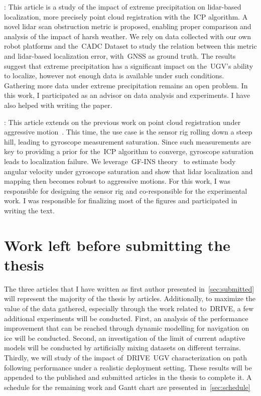 \documentclass[12pt,letterpaper,oneside]{article}
\begin{document}
\textbf{}:
This article is a study of the impact of extreme precipitation on lidar-based localization, more precisely point cloud registration with the~\ac{ICP} algorithm.
A novel lidar scan obstruction metric is proposed, enabling proper comparison and analysis of the impact of harsh weather.
We rely on data collected with our own robot platforms and the~\ac{CADC} Dataset to study the relation between this metric and lidar-based localization error, with~\ac{GNSS} as ground truth.
The results suggest that extreme precipitation has a significant impact on the~\ac{UGV}'s ability to localize, however not enough data is available under such conditions.
Gathering more data under extreme precipitation remains an open problem.
In this work, I participated as an advisor on data analysis and experiments.
I have also helped with writing the paper.

\textbf{}:
This article extends on the previous work on point cloud registration under aggressive motion~\citep{Deschenes2021}.
This time, the use case is the sensor rig rolling down a steep hill, leading to gyroscope measurement saturation.
Since such measurements are key to providing a prior for the~\ac{ICP} algorithm to converge, gyroscope saturation leads to localization failure.
We leverage~\ac{GF}-\ac{INS} theory~\citep{Pachter2013} to estimate body angular velocity under gyroscope saturation and show that lidar localization and mapping then becomes robust to aggressive motions.
For this work, I was responsible for designing the sensor rig and co-responsible for the experimental work.
I was responsible for finalizing most of the figures and participated in writing the text.

\section{Work left before submitting the thesis}
\label{sec:future_work}

The three articles that I have written as first author presented in~\autoref{sec:submitted} will represent the majority of the thesis by articles.
Additionally, to maximize the value of the data gathered, especially through the work related to~\ac{DRIVE}, a few additional experiments will be conducted.
First, an analysis of the performance improvement that can be reached through dynamic modelling for navigation on ice will be conducted.
Second, an investigation of the limit of current adaptive models will be conducted by artificially mixing datasets on different terrains.
Thirdly, we will study of the impact of~\ac{DRIVE}~\ac{UGV} characterization on path following performance under a realistic deployment setting.
These results will be appended to the published and submitted articles in the thesis to complete it.
A schedule for the remaining work and Gantt chart are presented in~\autoref{sec:schedule}
\end{document}
